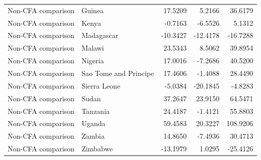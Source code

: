 \begin{table}
\begin{tabular}[t]{llrrr}
Non-CFA comparison & Guinea & 17.5209 & 5.2166 & 36.6179\\
Non-CFA comparison & Kenya & -0.7163 & -6.5526 & 5.1312\\
\addlinespace
Non-CFA comparison & Madagascar & -10.3427 & -12.4178 & -16.7288\\
Non-CFA comparison & Malawi & 23.5343 & 8.5062 & 39.8954\\
Non-CFA comparison & Nigeria & 17.0016 & -7.2686 & 40.5200\\
Non-CFA comparison & Sao Tome and Principe & 17.4606 & -1.4088 & 28.4490\\
Non-CFA comparison & Sierra Leone & -5.0384 & -20.1845 & -4.8283\\
\addlinespace
Non-CFA comparison & Sudan & 37.2647 & 23.9150 & 64.5471\\
Non-CFA comparison & Tanzania & 24.4187 & -1.4121 & 55.8803\\
Non-CFA comparison & Uganda & 59.4583 & 20.3227 & 108.9206\\
Non-CFA comparison & Zambia & 14.8650 & -7.4936 & 30.4713\\
Non-CFA comparison & Zimbabwe & -13.1979 & 1.0295 & -25.4126\\
\bottomrule
\end{tabular}
\end{table}